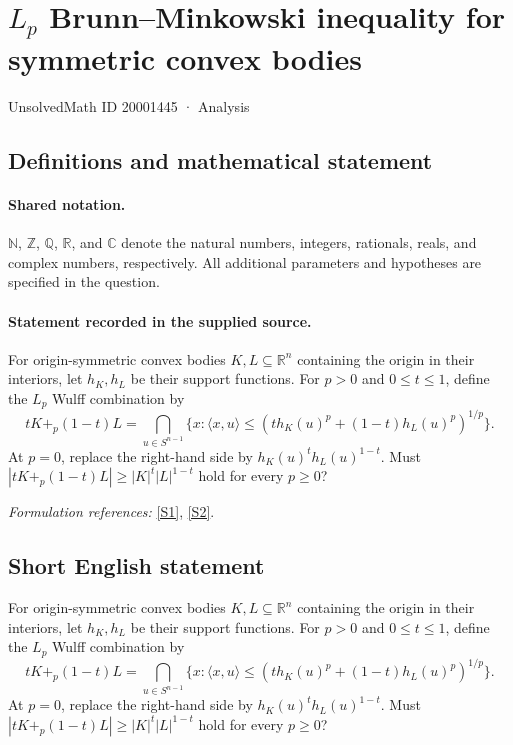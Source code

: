 \documentclass[11pt]{article}
\newcommand{\sref}[2]{\hyperlink{source:#1:#2}{[S#2]}}
\begin{document}
\setcounter{section}{20001444}
\section{\texorpdfstring{$L_p$ Brunn–Minkowski inequality for symmetric convex bodies}{L\_p Brunn–Minkowski inequality for symmetric convex bodies}}\label{20001445}
{\small UnsolvedMath ID 20001445 · Analysis}
\subsection{Definitions and mathematical statement}

\paragraph{Shared notation.}$\mathbb N$, $\mathbb Z$, $\mathbb Q$, $\mathbb R$, and $\mathbb C$ denote the natural numbers, integers, rationals, reals, and complex numbers, respectively. All additional parameters and hypotheses are specified in the question.


\paragraph{Statement recorded in the supplied source.}
For origin-symmetric convex bodies $K,L\subseteq\mathbb R^n$ containing the origin in their interiors, let $h_K,h_L$ be their support functions. For $p>0$ and $0\leq t\leq1$, define the $L_p$ Wulff combination by
\[tK+_p(1-t)L=\bigcap_{u\in S^{n-1}}\{x:\langle x,u\rangle\leq(th_K(u)^p+(1-t)h_L(u)^p)^{1/p}\}.\]
At $p=0$, replace the right-hand side by $h_K(u)^th_L(u)^{1-t}$. Must $|tK+_p(1-t)L|\geq|K|^t|L|^{1-t}$ hold for every $p\geq0$?
\par\smallskip\textit{Formulation references:} \sref{20001445}{1}, \sref{20001445}{2}.
\subsection{Short English statement}
For origin-symmetric convex bodies $K,L\subseteq\mathbb R^n$ containing the origin in their interiors, let $h_K,h_L$ be their support functions. For $p>0$ and $0\leq t\leq1$, define the $L_p$ Wulff combination by
\[tK+_p(1-t)L=\bigcap_{u\in S^{n-1}}\{x:\langle x,u\rangle\leq(th_K(u)^p+(1-t)h_L(u)^p)^{1/p}\}.\]
At $p=0$, replace the right-hand side by $h_K(u)^th_L(u)^{1-t}$. Must $|tK+_p(1-t)L|\geq|K|^t|L|^{1-t}$ hold for every $p\geq0$?
\end{document}
